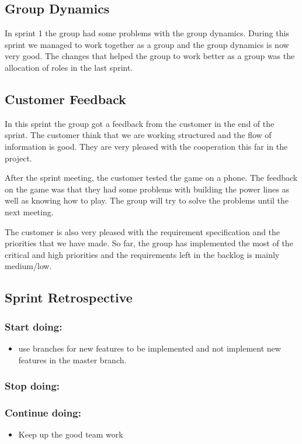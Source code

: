 \subsection{Group Dynamics}
	In sprint 1 the group had some problems with the group dynamics. 
	During this sprint we managed to work together as a group and the group dynamics
	is now very good. The changes that helped the group to work better as a group
	was the allocation of roles in the last sprint. 

\subsection{Customer Feedback}
	In this sprint the group got a feedback from the customer in the end of the sprint.
	The customer think that we are working structured and the flow of information is good.
	They are very pleased with the cooperation this far in the project.

	After the sprint meeting, the customer tested the game on a phone. The feedback on the game
	was that they had some problems with building the power lines as well as knowing how to play.
	The group will try to solve the problems until the next meeting.

	The customer is also very pleased with the requirement specification and the priorities
	that we have made. So far, the group has implemented the most of the critical and high
	priorities and the requirements left in the backlog is mainly medium/low. 

\subsection{Sprint Retrospective}
	\subsubsection*{Start doing: } 
		\begin{itemize}
			\item use branches for new features to be implemented and not implement new 
			features in the master branch.
		\end{itemize}
	\subsubsection*{Stop doing: }

	\subsubsection*{Continue doing: }
		\begin{itemize}
			\item Keep up the good team work
		\end{itemize}

